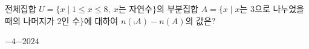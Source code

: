 전체집합 $U=\{x \mid 1\le x\le 8,\ x$는 자연수$\}$의 부분집합 $A=\{x \mid x$는 $3$으로 나누었을 때의 나머지가 $2$인 수$\}$에 대하여 $n(\comp{A})-n(A)$의 값은?
\begin{choices32}{$-4$}{$-2$}{$0$}{$2$}{$4$}\end{choices32}
